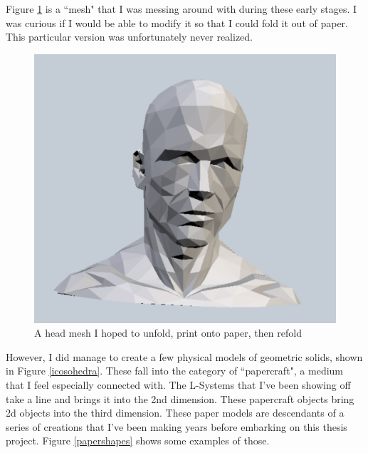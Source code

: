 \documentclass[12pt,twoside]{reedthesis}
\begin{document}
	Figure \ref{head} is a ``mesh" that I was messing around with during these early stages. I was curious if I would be able to modify it so that I could fold it out of paper. This particular version was unfortunately never realized.\\
	
	\begin{figure}[H]
	\centering
	\includegraphics[width=0.5\linewidth]{Images/Head}
	\caption{A head mesh I hoped to unfold, print onto paper, then refold}
	\label{head}
	\end{figure}

	
		However, I did manage to create a few physical models of geometric solids, shown in Figure \ref{icosohedra}. These fall into the category of ``papercraft", a medium that I feel especially connected with. The L-Systems that I've been showing off take a line and brings it into the 2nd dimension. These papercraft objects bring 2d objects into the third dimension. These paper models are descendants of a series of creations that I've been making years before embarking on this thesis project. Figure \ref{papershapes} shows some examples of those.\\
	
\end{document}

